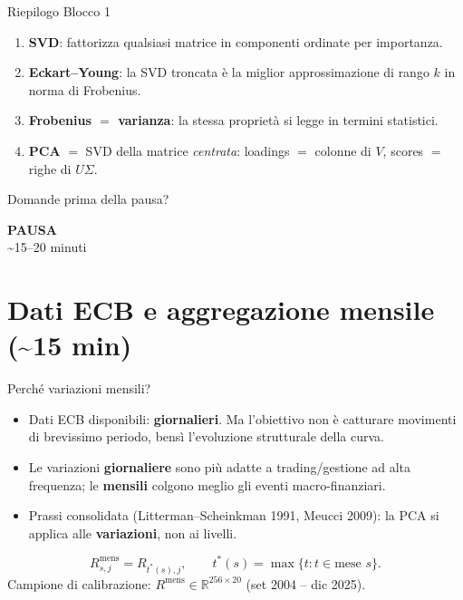 \documentclass[11pt,aspectratio=169]{beamer}
\newcommand{\R}{\mathbb{R}}
\begin{document}
\begin{frame}{Riepilogo Blocco 1}
\begin{enumerate}
  \item \textbf{SVD}: fattorizza qualsiasi matrice in componenti ordinate per importanza.
  \item \textbf{Eckart--Young}: la SVD troncata è la miglior approssimazione di rango $k$
        in norma di Frobenius.
  \item \textbf{Frobenius $=$ varianza}: la stessa proprietà si legge in termini statistici.
  \item \textbf{PCA} $=$ SVD della matrice \emph{centrata}: loadings $=$ colonne di $V$,
        scores $=$ righe di $U\Sigma$.
\end{enumerate}
\vspace{6pt}
\centering\Large Domande prima della pausa?
\end{frame}

\begin{frame}[plain]
\vfill
\begin{center}
{\Huge\textbf{PAUSA}}\\[10pt]
{\Large \textasciitilde 15--20 minuti}
\end{center}
\vfill
\end{frame}

\section{Dati ECB e aggregazione mensile (\textasciitilde15 min)}

\begin{frame}{Perché variazioni mensili?}
\begin{itemize}
  \item Dati ECB disponibili: \textbf{giornalieri}. Ma l'obiettivo non è catturare movimenti
        di brevissimo periodo, bensì l'evoluzione strutturale della curva.
  \item Le variazioni \textbf{giornaliere} sono più adatte a trading/gestione ad alta
        frequenza; le \textbf{mensili} colgono meglio gli eventi macro-finanziari.
  \item Prassi consolidata (Litterman--Scheinkman 1991, Meucci 2009): la PCA si applica alle
        \textbf{variazioni}, non ai livelli.
\end{itemize}
\[
  R^{\mathrm{mens}}_{s,j} = R_{t^\ast(s),j}, \qquad t^\ast(s) = \max\{t : t \in \text{mese } s\}.
\]
Campione di calibrazione: $R^{\mathrm{mens}} \in \R^{256\times 20}$ (set 2004 -- dic 2025).
\end{frame}
\end{document}
